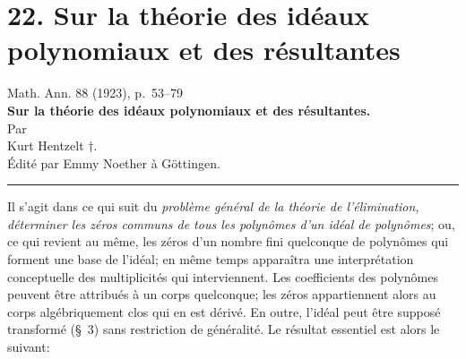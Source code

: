 \documentclass[11pt]{article}
\begin{document}
\fi


\setcounter{footnote}{0}
\section*{22. Sur la théorie des idéaux polynomiaux et des résultantes}
\begin{center}
Math. Ann. 88 (1923), p.~53--79\\[0.9em]
{\Large\bfseries Sur la théorie des idéaux polynomiaux et des résultantes.}\\[1.0em]
Par\\[0.45em]
Kurt Hentzelt \(\dagger\).\\[0.8em]
Édité par Emmy Noether à Göttingen\footnotemark.\\[0.6em]
\rule{4em}{0.4pt}
\end{center}

Il s'agit dans ce qui suit du \emph{problème général de la théorie de l'élimination, déterminer les zéros communs de tous les polynômes d'un idéal de polynômes}; ou, ce qui revient au même, les zéros d'un nombre fini quelconque de polynômes qui forment une base de l'idéal; en même temps apparaîtra une interprétation conceptuelle des multiplicités qui interviennent. Les coefficients des polynômes peuvent être attribués à un corps quelconque; les zéros appartiennent alors au corps algébriquement clos qui en est dérivé. En outre, l'idéal peut être supposé transformé (\S{}~3) sans restriction de généralité. Le résultat essentiel est alors le suivant:
\end{document}
